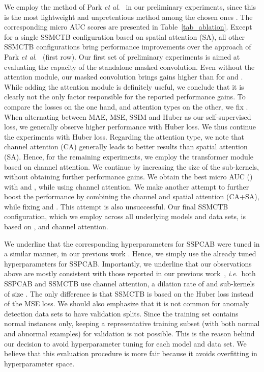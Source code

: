 \documentclass[10pt,journal,compsoc]{IEEEtran}
\newcommand{\etal}{\textit{et al}.}
\newcommand{\ie}{\textit{i}.\textit{e}.}
\begin{document}
We employ the method of Park \etal~\cite{Park-CVPR-2020} in our preliminary experiments, since this is the most lightweight and unpretentious method among the chosen ones \cite{Barbalau-ARXIV-2022,Zavrtanik-ICCV-2021, Schulter-ECCV-2022, Georgescu-TPAMI-2021, Liu-ICCV-2021, Park-CVPR-2020, Liu-CVPR-2018,He-CVPR-2022,Vasu-ICCV-2023,Wang-ICDM-2022}. The corresponding micro AUC scores are presented in Table~\ref{tab_ablation}. Except for a single SSMCTB configuration based on spatial attention (SA), all other SSMCTB configurations bring performance improvements over the approach of Park \etal~\cite{Park-CVPR-2020} (first row). Our first set of preliminary experiments is aimed at evaluating the capacity of the standalone masked convolution. Even without the attention module, our masked convolution brings gains higher than  for  and . While adding the attention module is definitely useful, we conclude that it is clearly not the only factor responsible for the reported performance gains. To compare the losses on the one hand, and attention types on the other, we fix . When alternating between MAE, MSE, SSIM and Huber as our self-supervised loss, we generally observe higher performance with Huber loss. We thus continue the experiments with Huber loss. Regarding the attention type, we note that channel attention (CA) generally leads to better results than spatial attention (SA). Hence, for the remaining experiments, we employ the transformer module based on channel attention. We continue by increasing the size of the sub-kernels, without obtaining further performance gains. We obtain the best micro AUC () with  and , while using channel attention. We make another attempt to further boost the performance by combining the channel and spatial attention (CA+SA), while fixing  and . This attempt is also unsuccessful. Our final SSMCTB configuration, which we employ across all underlying models and data sets, is based on ,  and channel attention.

We underline that the corresponding hyperparameters for SSPCAB were tuned in a similar manner, in our previous work \cite{Ristea-CVPR-2022}. Hence, we simply use the already tuned hyperparameters for SSPCAB. Importantly, we underline that our observations above are mostly consistent with those reported in our previous work~\cite{Ristea-CVPR-2022}, \ie~both SSPCAB and SSMCTB use channel attention, a dilation rate of  and sub-kernels of size . The only difference is that SSMCTB is based on the Huber loss instead of the MSE loss. We should also emphasize that it is not common for anomaly detection data sets to have validation splits. Since the training set contains normal instances only, keeping a representative training subset (with both normal and abnormal examples) for validation is not possible. This is the reason behind our decision to avoid hyperparameter tuning for each model and data set. We believe that this evaluation procedure is more fair because it avoids overfitting in hyperparameter space.
\end{document}
